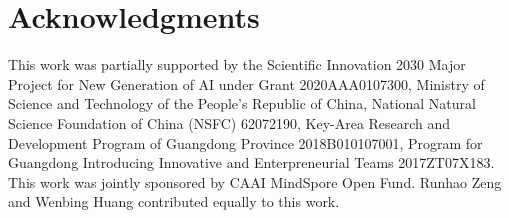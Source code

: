 \documentclass[10pt,journal,compsoc]{IEEEtran}
\begin{document}
	
	\section*{Acknowledgments}
	This work was partially supported by the Scientific Innovation 2030 Major Project for New Generation of AI under Grant 2020AAA0107300, Ministry of Science and Technology of the People's Republic of China,
	National Natural Science Foundation of China (NSFC) 62072190,
	Key-Area Research and Development Program of Guangdong Province 2018B010107001, Program for Guangdong Introducing Innovative and Enterpreneurial Teams 2017ZT07X183. This work was jointly sponsored by CAAI MindSpore Open Fund. Runhao Zeng and Wenbing Huang contributed equally to this work.
	
	
	
	
\end{document}
